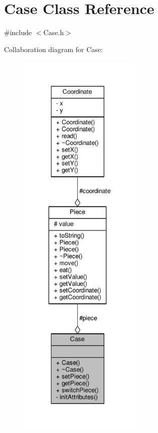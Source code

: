 \hypertarget{class_case}{}\section{Case Class Reference}
\label{class_case}


{\ttfamily \#include $<$Case.\+h$>$}



Collaboration diagram for Case\+:\nopagebreak
\begin{figure}[H]
\begin{center}
\leavevmode
\includegraphics[height=550pt]{class_case__coll__graph}
\end{center}
\end{figure}
